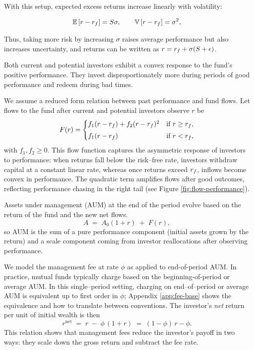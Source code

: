 With this setup, expected excess returns increase linearly with
volatility:

\[
{\mathbb{E}}\,[r-r_f]=S \sigma,\qquad {\mathbb{V}}\,[r-r_f]=\sigma^2,
\]

Thus, taking more risk by increasing \(\sigma\) raises average
performance but also increases uncertainty, and returns can be written
as \(r=r_f+\sigma(S+\epsilon)\).

Both current and potential investors exhibit a convex response to the
fund's positive performance. They invest disproportionately more during
periods of good performance and redeem during bad times.

We assume a reduced form relation between past performance and fund
flows. Let flows to the fund after current and potential investors
observe \(r\) be \begin{align}
    \label{eq:flow}
    F(r) = \begin{cases}
      f_1 (r-r_f) + f_2 (r-r_f)^2 & \text{if } r \ge r_f,\\[3pt]
      f_1 (r-r_f) & \text{if } r< r_f,
   \end{cases}
\end{align} with \(f_1,f_2\ge 0\). This flow function captures the
asymmetric response of investors to performance: when returns fall below
the risk--free rate, investors withdraw capital at a constant linear
rate, whereas once returns exceed \(r_f\), inflows become convex in
performance. The quadratic term amplifies flows after good outcomes,
reflecting performance chasing in the right tail (see Figure
\ref{fig:flow-performance}).

Assets under management (AUM) at the end of the period evolve based on
the return of the fund and the new net flows. \begin{equation}
    A \;=\; A_0(1+r)\;+\;F(r),
\end{equation} so AUM is the sum of a pure performance component
(initial assets grown by the return) and a scale component coming from
investor reallocations after observing performance.

We model the management fee at rate \(\phi\) as applied to end-of-period
AUM. In practice, mutual funds typically charge based on the
beginning-of-period or average AUM. In this single--period setting,
charging on end--of--period or average AUM is equivalent up to first
order in \(\phi\); Appendix \ref{app:fee-base} shows the equivalence and
how to translate between conventions. The investor's \emph{net} return
per unit of initial wealth is then \begin{equation}
\label{eq:net-return}
r^{\text{net}} \;=\; r \;-\; \phi\,(1+r) \;=\; (1-\phi)\,r - \phi.
\end{equation} This relation shows that management fees reduce the
investor's payoff in two ways: they scale down the gross return and
subtract the fee rate.

